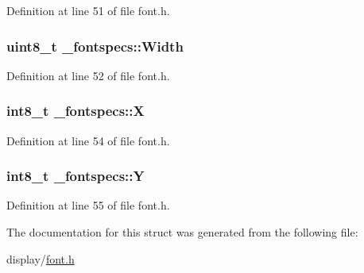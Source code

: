 Definition at line 51 of file font.\-h.

\hypertarget{struct__fontspecs_a8404888a24a2b065d91c4424e1907439}{
\subsubsection[{Width}]{\setlength{\rightskip}{0pt plus 5cm}uint8\-\_\-t \-\_\-fontspecs\-::\-Width}}\label{struct__fontspecs_a8404888a24a2b065d91c4424e1907439}


Definition at line 52 of file font.\-h.

\hypertarget{struct__fontspecs_a7273a891c79308389718266cb0b66f56}{
\subsubsection[{X}]{\setlength{\rightskip}{0pt plus 5cm}int8\-\_\-t \-\_\-fontspecs\-::\-X}}\label{struct__fontspecs_a7273a891c79308389718266cb0b66f56}


Definition at line 54 of file font.\-h.

\hypertarget{struct__fontspecs_a9771541eab33755d22c804f3bedf8682}{
\subsubsection[{Y}]{\setlength{\rightskip}{0pt plus 5cm}int8\-\_\-t \-\_\-fontspecs\-::\-Y}}\label{struct__fontspecs_a9771541eab33755d22c804f3bedf8682}


Definition at line 55 of file font.\-h.



The documentation for this struct was generated from the following file\-:\begin{DoxyCompactItemize}
\item 
display/\hyperlink{display_2font_8h}{font.\-h}\end{DoxyCompactItemize}
